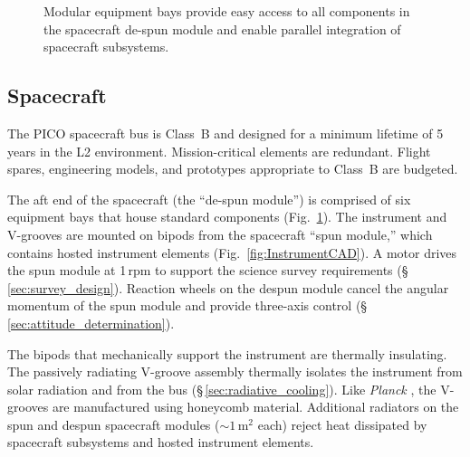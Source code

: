 \begin{figure}
\hspace{-0.15in}
\parbox{5.1in}{ }
\hspace{0.12in}
\parbox{1.3in}{
\caption{\captiontext
Modular equipment bays provide easy access to all components in the spacecraft de-spun module and enable parallel integration of spacecraft subsystems.\label{fig:Spacecraft}} }
\vspace{-0.25in}
\end{figure}

\subsection{Spacecraft}
\label{sec:spacecraft} %

The PICO spacecraft bus is Class~B and designed for a minimum lifetime of 5\,years in the L2 environment. Mission-critical elements are redundant. Flight spares, engineering models, and prototypes appropriate to Class~B are budgeted.

The aft end of the spacecraft (the ``de-spun module'') is comprised of
six equipment bays that house standard components
(Fig.~\ref{fig:Spacecraft}).  The instrument and V-grooves are mounted on
bipods from the spacecraft ``spun module,'' which contains hosted
instrument elements (Fig.~\ref{fig:InstrumentCAD}). A motor drives the
spun module at 1\,rpm to support the science survey requirements
(\S\,\ref{sec:survey_design}). Reaction wheels on the despun module
cancel the angular momentum of the spun module and provide three-axis
control (\S\,\ref{sec:attitude_determination}).

The bipods that mechanically support the instrument are thermally
insulating. The passively radiating V-groove assembly thermally
isolates the instrument from solar radiation and from the bus
(\S\,\ref{sec:radiative_cooling}). Like \textit{Planck} \citep{Tauber2010}, the V-grooves are
manufactured using honeycomb material. Additional radiators on the
spun and despun spacecraft modules ($\sim1$\,m$^2$ each) reject heat
dissipated by spacecraft subsystems and hosted instrument elements.

